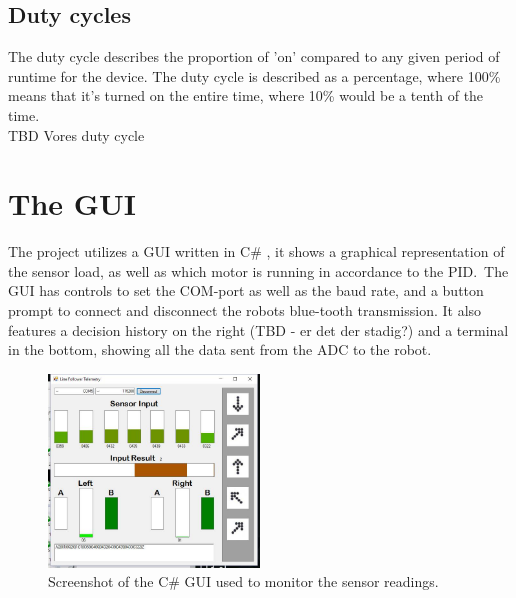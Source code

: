 \subsection{Duty cycles}
The duty cycle describes the proportion of 'on' compared to any given period of runtime for the device. The duty cycle is described as a percentage, where 100\% means that it's turned on the entire time, where 10\% would be a tenth of the time.\\
TBD Vores duty cycle

\section{The GUI}
The project utilizes a GUI written in C\# , it shows a graphical representation of the sensor load, as well as which motor is running in accordance to the PID.\
The GUI has controls to set the COM-port as well as the baud rate, and a button prompt to connect and disconnect the robots blue-tooth transmission. It also features a decision history on the right (TBD - er det der stadig?) and a terminal in the bottom, showing all the data sent from the ADC to the robot.

\begin{figure}[h!]
  \centering
  \includegraphics[width=0.5\textwidth]{figures/guiexample.png}  
\caption{Screenshot of the C\# GUI used to monitor the sensor readings.}  
  \label{PID controller}
\end{figure}